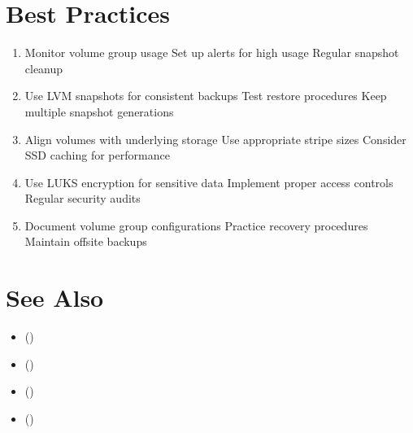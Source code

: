 \documentclass[letterpaper,10pt,english]{sphinxmanual}
\begin{document}
\section{Best Practices}
\label{\detokenize{volume-management:best-practices}}\begin{enumerate}
%
\item {} 
\sphinxAtStartPar
{}
\sphinxhyphen{} Monitor volume group usage
\sphinxhyphen{} Set up alerts for high usage
\sphinxhyphen{} Regular snapshot cleanup

\item {} 
\sphinxAtStartPar
{}
\sphinxhyphen{} Use LVM snapshots for consistent backups
\sphinxhyphen{} Test restore procedures
\sphinxhyphen{} Keep multiple snapshot generations

\item {} 
\sphinxAtStartPar
{}
\sphinxhyphen{} Align volumes with underlying storage
\sphinxhyphen{} Use appropriate stripe sizes
\sphinxhyphen{} Consider SSD caching for performance

\item {} 
\sphinxAtStartPar
{}
\sphinxhyphen{} Use LUKS encryption for sensitive data
\sphinxhyphen{} Implement proper access controls
\sphinxhyphen{} Regular security audits

\item {} 
\sphinxAtStartPar
{}
\sphinxhyphen{} Document volume group configurations
\sphinxhyphen{} Practice recovery procedures
\sphinxhyphen{} Maintain offsite backups

\end{enumerate}


\section{See Also}
\label{\detokenize{volume-management:see-also}}\begin{itemize}
\item {} 
\sphinxAtStartPar
{\hyperref[\detokenize{disk-management::doc}]{}} ()

\item {} 
\sphinxAtStartPar
{\hyperref[\detokenize{file-systems::doc}]{}} ()

\item {} 
\sphinxAtStartPar
{\hyperref[\detokenize{raid-systems::doc}]{}} ()

\item {} 
\sphinxAtStartPar
{\hyperref[\detokenize{troubleshooting::doc}]{}} ()

\end{itemize}
\end{document}
